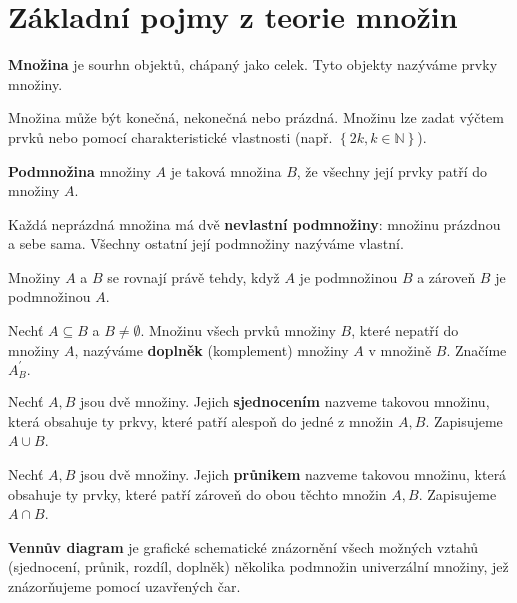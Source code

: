 \section{Základní pojmy z teorie množin}
\begin{definition}
  \textbf{Množina} je sourhn objektů, chápaný jako celek. Tyto objekty nazýváme prvky množiny.
\end{definition}

Množina může být konečná, nekonečná nebo prázdná. Množinu lze zadat výčtem prvků nebo pomocí charakteristické vlastnosti (např. $\left \{ 2k, k \in \mathbb{N}\right\}$).

\begin{definition}
  \textbf{Podmnožina} množiny $A$ je taková množina $B$, že všechny její prvky patří do množiny $A$.
\end{definition}

Každá neprázdná množina má dvě \textbf{nevlastní podmnožiny}: množinu prázdnou a sebe sama. Všechny ostatní její podmnožiny nazýváme vlastní.

\begin{definition}
  Množiny $A$ a $B$ se rovnají právě tehdy, když $A$ je podmnožinou $B$ a zároveň $B$ je podmnožinou $A$.
\end{definition}

\begin{definition}
  Nechť $A \subseteq B$ a $B\neq \emptyset$. Množinu všech prvků množiny $B$, které nepatří do množiny $A$, nazýváme \textbf{doplněk} (komplement) množiny $A$ v množině $B$. Značíme $A_B^\prime.$
\end{definition}

\begin{definition}
  Nechť $A, B$ jsou dvě množiny. Jejich \textbf{sjednocením} nazveme takovou množinu, která obsahuje ty prkvy, které patří alespoň do jedné z množin $A, B$. Zapisujeme $A \cup B$.
\end{definition}

\begin{definition}
  Nechť $A, B$ jsou dvě množiny. Jejich \textbf{průnikem} nazveme takovou množinu, která obsahuje ty prvky, které patří zároveň do obou těchto množin $A, B$. Zapisujeme $A \cap B$.
\end{definition}

\begin{definition}
  \textbf{Vennův diagram} je grafické schematické znázornění všech možných vztahů (sjednocení, průnik, rozdíl, doplněk) několika podmnožin univerzální množiny, jež znázorňujeme pomocí uzavřených čar.
\end{definition}

